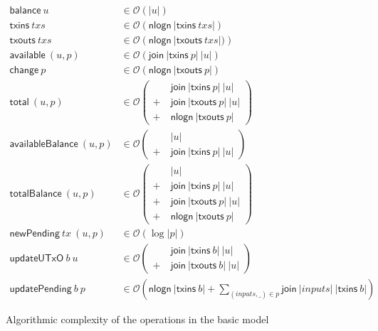\documentclass{article}
\newcommand{\order}[1]{\mathcal{O}\left(#1\right)}
\numberwithin{equation}{lemma}
\begin{document}
\begin{figure}
\begin{equation*}
\begin{split}
\mathsf{balance} ~ u & \in \order{|u|} \\
\mathsf{txins}   ~ txs  & \in \order{\mathsf{nlogn} ~ |\mathsf{txins}~ txs|} \\
\mathsf{txouts}  ~ txs  & \in \order{\mathsf{nlogn} ~ |\mathsf{txouts}~ txs|)} \\
\mathsf{available} ~ (u,p) & \in \order{\mathsf{join} ~ |\mathsf{txins}~ p| ~ |u|} \\
\mathsf{change}    ~ p     & \in \order{\mathsf{nlogn} ~ |\mathsf{txouts}~ p| } \\
\mathsf{total}     ~ (u,p) & \in \order{
                              \begin{split}
                                & ~ \mathsf{join} ~ |\mathsf{txins}~ p| ~ |u| \\
                              + & ~ \mathsf{join} ~ |\mathsf{txouts}~ p| ~ |u| \\
                              + & ~ \mathsf{nlogn} ~ |\mathsf{txouts}~ p|
                              \end{split}} \\
\mathsf{availableBalance} ~ (u,p) & \in \order{
                              \begin{split}
                                & ~ |u| \\
                              + & ~ \mathsf{join} ~ |\mathsf{txins}~ p| ~ |u|
                              \end{split}} \\
\mathsf{totalBalance}     ~ (u,p) & \in \order{
                              \begin{split}
                                & ~ |u| \\
                              + & ~ \mathsf{join} ~ |\mathsf{txins}~ p| ~ |u| \\
                              + & ~ \mathsf{join} ~ |\mathsf{txouts}~ p| ~ |u| \\
                              + & ~ \mathsf{nlogn} ~ |\mathsf{txouts}~ p|
                              \end{split}} \\
\mathsf{newPending} ~ tx ~ (u,p) & \in \order{\log |p|} \\
\mathsf{updateUTxO} ~ b ~ u & \in \order{
                              \begin{split}
                                & ~ \mathsf{join} ~ |\mathsf{txins}~ b| ~ |u| \\
                              + & ~ \mathsf{join} ~ |\mathsf{txouts}~ b| ~ |u|
                              \end{split}} \\
\mathsf{updatePending} ~ b ~ p & \in \order{\mathsf{nlogn} ~ |\mathsf{txins}~ b| + \sum_{(inputs, \_) \in p}{\mathsf{join} ~ |inputs| ~ |\mathsf{txins}~ b|}}
\end{split}
\end{equation*}
\caption{\label{fig:basic_model_complexity}Algorithmic complexity of the operations in the basic model}
\end{figure}
\end{document}
